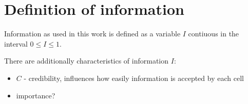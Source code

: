 
\chapter{Definition of information}

Information as used in this work is defined as a variable $I$ contiuous in the interval $0 \leq I \leq 1$.

There are additionally characteristics of information $I$:

\begin{itemize}
    \item $C$ - credibility, influences how easily information is accepted by each cell
    \item importance?
\end{itemize}
